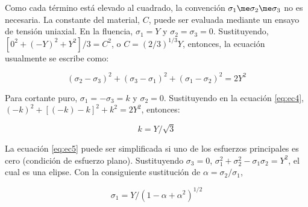 Como cada término está elevado al cuadrado, la convención $\sigma_1 \me \sigma_2 \me \sigma_3$ no es necesaria. 
La constante del material, $C$, puede ser evaluada mediante un ensayo de tensión uniaxial. En la fluencia, 
$\sigma_1 = Y$ y $\sigma_2 = \sigma_3 = 0$. Sustituyendo, $[0^2 + (-Y)^2 + Y^2]/3 = C^2$, o 
$C = (2/3)^{1/3} Y $, entonces, la ecuación usualmente se escribe como:

\begin{equation}\label{eq:ec4}
(\sigma_2-\sigma_3)^2 + (\sigma_3-\sigma_1 )^2 + (\sigma_1-\sigma_2 )^2 = 2Y^2
\end{equation}

Para cortante puro, $\sigma_1 = -\sigma_3 = k$ y $\sigma_2=0$. Sustituyendo en la ecuación \ref{eq:ec4}, 
$ (-k)^2 + [ (-k)-k ]^2 + k^2 = 2Y^2 $, entonces:

\begin{equation}\label{eq:ec5}
k = Y/\sqrt{3}
\end{equation}

La ecuación \ref{eq:ec5} puede ser simplificada si uno de los esfuerzos principales es cero (condición de esfuerzo plano). 
Sustituyendo $\sigma_3 = 0$, $\sigma_1^2 + \sigma_2^2 - \sigma_1 \sigma_2 = Y^2$, el cual es una elipse. Con la 
consiguiente sustitución de $\alpha = \sigma_2/\sigma_1$,

\begin{equation}
\sigma_1 = Y/(1-\alpha+\alpha^2)^{1/2}
\end{equation}





